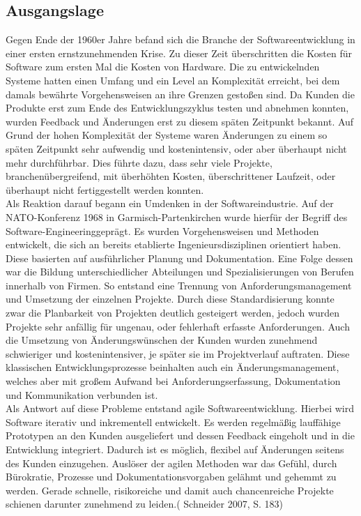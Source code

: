 \subsection{Ausgangslage}
Gegen Ende der 1960er Jahre befand sich die Branche der Softwareentwicklung in einer ersten ernstzunehmenden Krise. Zu dieser Zeit überschritten die Kosten für Software zum ersten Mal die Kosten von Hardware. Die zu entwickelnden Systeme hatten einen Umfang und ein Level an Komplexität erreicht, bei dem damals bewährte Vorgehensweisen an ihre Grenzen gestoßen sind. Da Kunden die Produkte erst zum Ende des Entwicklungszyklus testen und abnehmen konnten, wurden Feedback und Änderungen erst zu diesem späten Zeitpunkt bekannt. Auf Grund der hohen Komplexität der Systeme waren Änderungen zu einem so späten Zeitpunkt sehr aufwendig und kostenintensiv, oder aber überhaupt nicht mehr durchführbar. Dies führte dazu, dass sehr viele Projekte, branchenübergreifend, mit überhöhten Kosten, überschrittener Laufzeit, oder überhaupt nicht fertiggestellt werden konnten.\\
Als Reaktion darauf begann ein Umdenken in der Softwareindustrie. Auf der NATO-Konferenz 1968 in Garmisch-Partenkirchen wurde hierfür der Begriff des \glqq Software-Engineering\grqq geprägt. Es wurden Vorgehensweisen und Methoden entwickelt, die sich an bereits etablierte Ingenieursdisziplinen orientiert haben. Diese basierten auf ausführlicher Planung und Dokumentation. Eine Folge dessen war die Bildung unterschiedlicher Abteilungen und Spezialisierungen von Berufen innerhalb von Firmen. So entstand eine Trennung von Anforderungsmanagement und Umsetzung der einzelnen Projekte. Durch diese Standardisierung konnte zwar die Planbarkeit von Projekten deutlich gesteigert werden, jedoch wurden Projekte sehr anfällig für ungenau, oder fehlerhaft erfasste Anforderungen. Auch die Umsetzung von Änderungswünschen der Kunden wurden zunehmend schwieriger und kostenintensiver, je später sie im Projektverlauf auftraten. Diese klassischen Entwicklungsprozesse beinhalten auch ein Änderungsmanagement, welches aber mit großem Aufwand bei Anforderungserfassung, Dokumentation und Kommunikation verbunden ist.\\
Als Antwort auf diese Probleme entstand agile Softwareentwicklung. Hierbei wird Software iterativ und inkrementell entwickelt. Es werden regelmäßig lauffähige Prototypen an den Kunden ausgeliefert und dessen Feedback eingeholt und in die Entwicklung integriert. Dadurch ist es möglich, flexibel auf Änderungen seitens des Kunden einzugehen. \glqq Auslöser der agilen Methoden war das Gefühl, durch Bürokratie, Prozesse und Dokumentationsvorgaben gelähmt und gehemmt zu werden. Gerade schnelle, risikoreiche und damit auch chancenreiche Projekte schienen darunter zunehmend zu leiden.\grqq ( Schneider 2007, S. 183)
